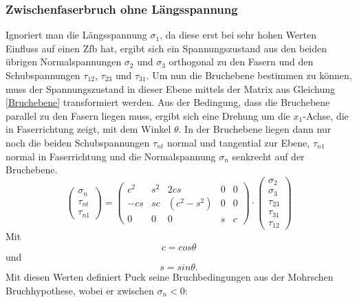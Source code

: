 \subsubsection{Zwischenfaserbruch ohne Längsspannung}
Ignoriert man die Längsspannung $\sigma_1$, da diese erst bei sehr hohen Werten Einfluss auf einen Zfb hat, ergibt sich ein Spannungszustand aus den beiden übrigen Normalspannungen $\sigma_2$ und $\sigma_3$ orthogonal zu den Fasern und den Schubspannungen $\tau_{12}$, $\tau_{23}$ und $\tau_{31}$. Um nun die Bruchebene bestimmen zu können, muss der Spannungszustand in dieser Ebene mittels der Matrix aus Gleichung \ref{Bruchebene} transformiert werden. Aus der Bedingung, dass die Bruchebene parallel zu den Fasern liegen muss, ergibt sich eine Drehung um die $x_1$-Achse, die in Faserrichtung zeigt, mit dem Winkel $\theta$. In der Bruchebene liegen dann nur noch die beiden Schubspannungen $\tau_{nt}$ normal und tangential zur Ebene, $\tau_{n1}$ normal in Faserrichtung und die Normalspannung $\sigma_n$ senkrecht auf der Bruchebene.
\begin{equation}\label{Bruchebene}
	\begin{pmatrix}
		\sigma_n \\ \tau_{nt} \\ \tau_{n1}
	\end{pmatrix}
	=
	\begin{pmatrix}
		c^2 & s^2 & 2cs & 0 & 0\\
		-cs & sc & (c^2-s^2) & 0 & 0\\
		0 & 0 & 0 & s & c
	\end{pmatrix}
	\cdot
	\begin{pmatrix}
		\sigma_2 \\ \sigma_3 \\ \tau_{23} \\ \tau_{31} \\ \tau_{12}
	\end{pmatrix}
\end{equation}
Mit
\begin{equation}
	c = cos\theta
\end{equation}
und
\begin{equation}
	s = sin\theta.
\end{equation}
Mit diesen Werten definiert Puck seine Bruchbedingungen aus der Mohrschen Bruchhypothese\cite{item3}, wobei er zwischen $\sigma_n < 0$:
